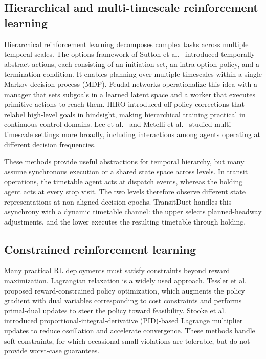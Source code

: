 \subsection{Hierarchical and multi-timescale reinforcement learning}
\label{subsec:hierarchical_rl}

Hierarchical reinforcement learning decomposes complex tasks across multiple temporal scales. The options framework of Sutton et al.~\citep{sutton1999between} introduced temporally abstract actions, each consisting of an initiation set, an intra-option policy, and a termination condition. It enables planning over multiple timescales within a single Markov decision process (MDP). Feudal networks \citep{vezhnevets2017feudal} operationalize this idea with a manager that sets subgoals in a learned latent space and a worker that executes primitive actions to reach them. HIRO \citep{nachum2018data} introduced off-policy corrections that relabel high-level goals in hindsight, making hierarchical training practical in continuous-control domains. Lee et al.~\citep{lee2020reinforcement} and Metelli et al.~\citep{metelli2020control} studied multi-timescale settings more broadly, including interactions among agents operating at different decision frequencies.

These methods provide useful abstractions for temporal hierarchy, but many assume synchronous execution or a shared state space across levels. In transit operations, the timetable agent acts at dispatch events, whereas the holding agent acts at every stop visit. The two levels therefore observe different state representations at non-aligned decision epochs. TransitDuet handles this asynchrony with a dynamic timetable channel: the upper selects planned-headway adjustments, and the lower executes the resulting timetable through holding.

\subsection{Constrained reinforcement learning}
\label{subsec:constrained_rl}

Many practical RL deployments must satisfy constraints beyond reward maximization. Lagrangian relaxation is a widely used approach. Tessler et al.~\citep{tessler2019reward} proposed reward-constrained policy optimization, which augments the policy gradient with dual variables corresponding to cost constraints and performs primal-dual updates to steer the policy toward feasibility. Stooke et al.~\citep{stooke2020responsive} introduced proportional-integral-derivative (PID)-based Lagrange multiplier updates to reduce oscillation and accelerate convergence. These methods handle soft constraints, for which occasional small violations are tolerable, but do not provide worst-case guarantees.

